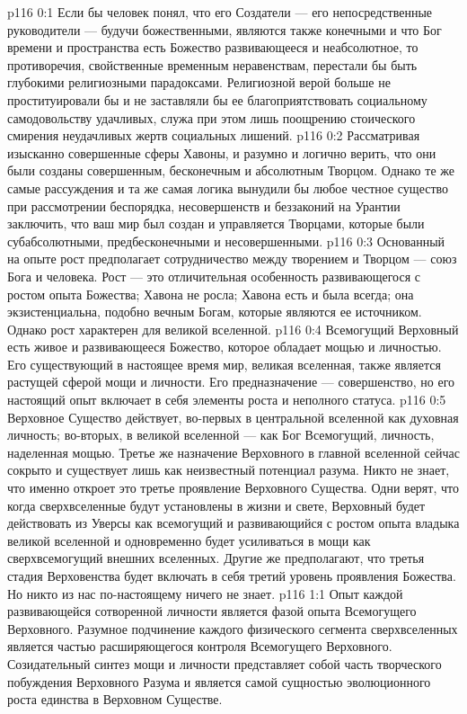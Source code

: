 \author{Могучий Вестник}
\vs p116 0:1 Если бы человек понял, что его Создатели --- его непосредственные руководители --- будучи божественными, являются также конечными и что Бог времени и пространства есть Божество развивающееся и неабсолютное, то противоречия, свойственные временным неравенствам, перестали бы быть глубокими религиозными парадоксами. Религиозной верой больше не проституировали бы и не заставляли бы ее благоприятствовать социальному самодовольству удачливых, служа при этом лишь поощрению стоического смирения неудачливых жертв социальных лишений.
\vs p116 0:2 Рассматривая изысканно совершенные сферы Хавоны, и разумно и логично верить, что они были созданы совершенным, бесконечным и абсолютным Творцом. Однако те же самые рассуждения и та же самая логика вынудили бы любое честное существо при рассмотрении беспорядка, несовершенств и беззаконий на Урантии заключить, что ваш мир был создан и управляется Творцами, которые были субабсолютными, предбесконечными и несовершенными.
\vs p116 0:3 \pc Основанный на опыте рост предполагает сотрудничество между творением и Творцом --- союз Бога и человека. Рост --- это отличительная особенность развивающегося с ростом опыта Божества; Хавона не росла; Хавона есть и была всегда; она экзистенциальна, подобно вечным Богам, которые являются ее источником. Однако рост характерен для великой вселенной.
\vs p116 0:4 Всемогущий Верховный есть живое и развивающееся Божество, которое обладает мощью и личностью. Его существующий в настоящее время мир, великая вселенная, также является растущей сферой мощи и личности. Его предназначение --- совершенство, но его настоящий опыт включает в себя элементы роста и неполного статуса.
\vs p116 0:5 \pc Верховное Существо действует, во\hyp{}первых в центральной вселенной как духовная личность; во\hyp{}вторых, в великой вселенной --- как Бог Всемогущий, личность, наделенная мощью. Третье же назначение Верховного в главной вселенной сейчас сокрыто и существует лишь как неизвестный потенциал разума. Никто не знает, что именно откроет это третье проявление Верховного Существа. Одни верят, что когда сверхвселенные будут установлены в жизни и свете, Верховный будет действовать из Уверсы как всемогущий и развивающийся с ростом опыта владыка великой вселенной и одновременно будет усиливаться в мощи как сверхвсемогущий внешних вселенных. Другие же предполагают, что третья стадия Верховенства будет включать в себя третий уровень проявления Божества. Но никто из нас по\hyp{}настоящему ничего не знает.
\vs p116 1:1 Опыт каждой развивающейся сотворенной личности является фазой опыта Всемогущего Верховного. Разумное подчинение каждого физического сегмента сверхвселенных является частью расширяющегося контроля Всемогущего Верховного. Созидательный синтез мощи и личности представляет собой часть творческого побуждения Верховного Разума и является самой сущностью эволюционного роста единства в Верховном Существе.
